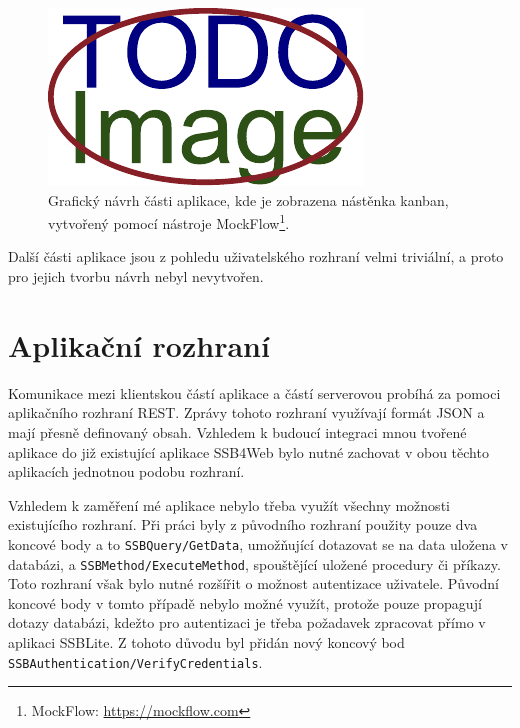 \begin{figure}[H]
	\centering
	\label{img:design-kanban}
	\includegraphics[width=\textwidth]{obrazky-figures/placeholder.pdf}
	\caption{Grafický návrh části aplikace, kde je zobrazena nástěnka kanban, vytvořený pomocí nástroje MockFlow\footnote{MockFlow: \url{https://mockflow.com}}.}
\end{figure}

Další části aplikace jsou z pohledu uživatelského rozhraní velmi triviální, a proto pro jejich tvorbu návrh nebyl nevytvořen.


\section{Aplikační rozhraní}\label{sec:api}
Komunikace mezi klientskou částí aplikace a částí serverovou probíhá za pomoci aplikačního rozhraní REST. Zprávy tohoto rozhraní využívají formát JSON a mají přesně definovaný obsah.
Vzhledem k budoucí integraci mnou tvořené aplikace do již existující aplikace SSB4Web bylo nutné zachovat v obou těchto aplikacích jednotnou podobu rozhraní.

Vzhledem k zaměření mé aplikace nebylo třeba využít všechny možnosti existujícího rozhraní. Při práci byly z původního rozhraní použity pouze dva koncové body a to \texttt{SSBQuery/GetData}, umožňující dotazovat se na data uložena v databázi, a \sloppy\texttt{SSBMethod/ExecuteMethod}, spouštějící uložené procedury či příkazy. Toto rozhraní však bylo nutné rozšířit o možnost autentizace uživatele. Původní koncové body v tomto případě nebylo možné využít, protože pouze propagují dotazy databázi, kdežto pro autentizaci je třeba požadavek zpracovat přímo v aplikaci SSBLite. Z tohoto důvodu byl přidán nový koncový bod \sloppy\texttt{SSBAuthentication/VerifyCredentials}.

